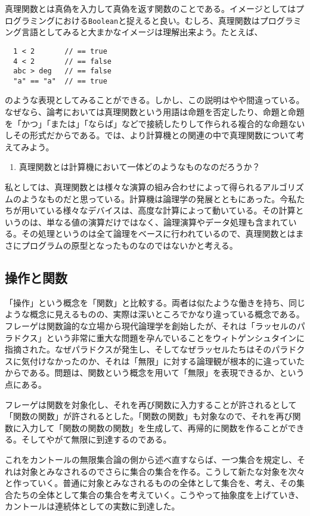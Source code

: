 \documentclass[11pt,a4paper,onecolumn,article]{jarticle}
\newcounter{ct}               %
\begin{document}
真理関数とは真偽を入力して真偽を返す関数のことである。イメージとしてはプログラミングにおける\texttt{Boolean}と捉えると良い。むしろ、真理関数はプログラミング言語としてみると大まかなイメージは理解出来よう。たとえば、
\begin{verbatim}
  1 < 2       // == true
  4 < 2       // == false
  abc > deg   // == false
  "a" == "a"  // == true
\end{verbatim}
のような表現としてみることができる。しかし、この説明はやや間違っている。なぜなら、論考においては真理関数という用語は命題を否定したり、命題と命題を「かつ」「または」「ならば」などで接続したりして作られる複合的な命題ないしその形式だからである。では、より計算機との関連の中で真理関数について考えてみよう。
\begin{enumerate}
  \item 真理関数とは計算機において一体どのようなものなのだろうか？
\end{enumerate}

私としては、真理関数とは様々な演算の組み合わせによって得られるアルゴリズムのようなものだと思っている。計算機は論理学の発展とともにあった。今私たちが用いている様々なデバイスは、高度な計算によって動いている。その計算というのは、単なる値の演算だけではなく、論理演算やデータ処理も含まれている。その処理というのは全て論理をベースに行われているので、真理関数とはまさにプログラムの原型となったものなのではないかと考える。


\subsection{操作と関数}

「操作」という概念を「関数」と比較する。両者は似たような働きを持ち、同じような概念に見えるものの、実際は深いところでかなり違っている概念である。フレーゲは関数論的な立場から現代論理学を創始したが、それは「ラッセルのパラドクス」という非常に重大な問題を孕んでいることをウィトゲンシュタインに指摘された。なぜパラドクスが発生し、そしてなぜラッセルたちはそのパラドクスに気付けなかったのか、それは「無限」に対する論理観が根本的に違っていたからである。問題は、関数という概念を用いて「無限」を表現できるか、という点にある。

フレーゲは関数を対象化し、それを再び関数に入力することが許されるとして「関数の関数」が許されるとした。「関数の関数」も対象なので、それを再び関数に入力して「関数の関数の関数」を生成して、再帰的に関数を作ることができる。そしてやがて無限に到達するのである。

これをカントールの無限集合論の側から述べ直すならば、一つ集合を規定し、それは対象とみなされるのでさらに集合の集合を作る。こうして新たな対象を次々と作っていく。普通に対象とみなされるものの全体として集合を、考え、その集合たちの全体として集合の集合を考えていく。こうやって抽象度を上げていき、カントールは連続体としての実数に到達した。
\end{document}
